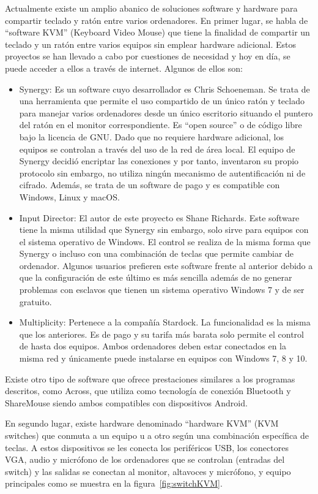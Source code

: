 Actualmente existe un amplio abanico de soluciones software y hardware para compartir teclado y ratón entre varios ordenadores. En primer lugar, se habla de ``software KVM'' (Keyboard Video Mouse) que tiene la finalidad de compartir un teclado y un ratón entre varios equipos sin emplear hardware adicional. Estos proyectos se han llevado a cabo por cuestiones de necesidad y hoy en día, se puede acceder a ellos a través de internet. Algunos de ellos son:

\begin{itemize}
    \item Synergy: Es un software cuyo desarrollador es Chris Schoeneman. Se trata de una herramienta que permite el uso compartido de un único ratón y teclado para manejar varios ordenadores desde un único escritorio situando el puntero del ratón en el monitor correspondiente. Es ``open source'' o de código libre bajo la licencia de GNU. Dado que no requiere hardware adicional, los equipos se controlan a través del uso de la red de área local. El equipo de Synergy decidió encriptar las conexiones y por tanto, inventaron su propio protocolo sin embargo, no utiliza ningún mecanismo de autentificación ni de cifrado. Además, se trata de un software de pago y es compatible con Windows, Linux y macOS.
    \item Input Director: El autor de este proyecto es Shane Richards. Este software tiene la misma utilidad que Synergy sin embargo, solo sirve para equipos con el sistema operativo de Windows. El control se realiza de la misma forma que Synergy o incluso con una combinación de teclas que permite cambiar de ordenador. Algunos usuarios prefieren este software frente al anterior debido a que la configuración de este último es más sencilla además de no generar problemas con esclavos que tienen un sistema operativo Windows 7 y de ser gratuito.
    \item Multiplicity: Pertenece a la compañía Stardock. La funcionalidad es la misma que los anteriores. Es de pago y su tarifa más barata solo permite el control de hasta dos equipos. Ambos ordenadores deben estar conectados en la misma red y únicamente puede instalarse en equipos con Windows 7, 8 y 10.
\end{itemize}

Existe otro tipo de software que ofrece prestaciones similares a los programas descritos, como Across, que utiliza como tecnología de conexión Bluetooth y ShareMouse siendo ambos compatibles con dispositivos Android.

En segundo lugar, existe hardware denominado ``hardware KVM'' (KVM switches) que conmuta a un equipo u a otro según una combinación específica de teclas. A estos dispositivos se les conecta los periféricos USB, los conectores VGA, audio y micrófono de los ordenadores que se controlan (entradas del switch) y las salidas se conectan al monitor, altavoces y micrófono, y equipo principales como se muestra en la figura~\ref{fig:switchKVM}.

